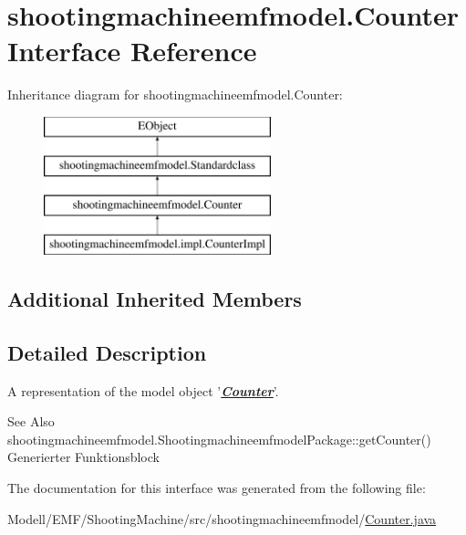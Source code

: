 \hypertarget{interfaceshootingmachineemfmodel_1_1_counter}{\section{shootingmachineemfmodel.\-Counter Interface Reference}
\label{interfaceshootingmachineemfmodel_1_1_counter}
}
Inheritance diagram for shootingmachineemfmodel.\-Counter\-:\begin{figure}[H]
\begin{center}
\leavevmode
\includegraphics[height=4.000000cm]{interfaceshootingmachineemfmodel_1_1_counter}
\end{center}
\end{figure}
\subsection*{Additional Inherited Members}


\subsection{Detailed Description}
A representation of the model object '{\itshape {\bfseries \hyperlink{interfaceshootingmachineemfmodel_1_1_counter}{Counter}}}'.

\begin{DoxySeeAlso}{See Also}
shootingmachineemfmodel.\-Shootingmachineemfmodel\-Package\-::get\-Counter()  Generierter Funktionsblock 
\end{DoxySeeAlso}


The documentation for this interface was generated from the following file\-:\begin{DoxyCompactItemize}
\item 
Modell/\-E\-M\-F/\-Shooting\-Machine/src/shootingmachineemfmodel/\hyperlink{_counter_8java}{Counter.\-java}\end{DoxyCompactItemize}
